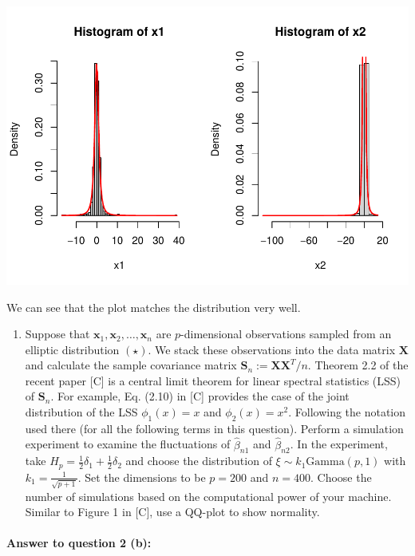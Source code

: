 \documentclass[
]{article}
\providecommand{\tightlist}{%
  \setlength{\itemsep}{0pt}\setlength{\parskip}{0pt}}
\begin{document}
\includegraphics{A5_files/figure-latex/unnamed-chunk-16-1.pdf}

We can see that the plot matches the distribution very well.

\begin{enumerate}
\def\labelenumi{(\alph{enumi})}
\setcounter{enumi}{1}
\tightlist
\item
  Suppose that \(\mathbf{x}_1, \mathbf{x}_2, \dots, \mathbf{x}_n\) are
  \(p\)-dimensional observations sampled from an elliptic distribution
  \((\star)\). We stack these observations into the data matrix
  \(\mathbf{X}\) and calculate the sample covariance matrix
  \(\mathbf{S}_n := \mathbf{X} \mathbf{X}^T / n\). Theorem 2.2 of the
  recent paper {[}C{]} is a central limit theorem for linear spectral
  statistics (LSS) of \(\mathbf{S}_n\). For example, Eq. (2.10) in
  {[}C{]} provides the case of the joint distribution of the LSS
  \(\phi_1(x) = x\) and \(\phi_2(x) = x^2\). Following the notation used
  there (for all the following terms in this question). Perform a
  simulation experiment to examine the fluctuations of
  \(\hat{\beta}_{n1}\) and \(\hat{\beta}_{n2}\). In the experiment, take
  \(H_p = \frac{1}{2} \delta_1 + \frac{1}{2} \delta_2\) and choose the
  distribution of \(\xi \sim k_1 \text{Gamma}(p, 1)\) with
  \(k_1 = \frac{1}{\sqrt{p + 1}}\). Set the dimensions to be \(p = 200\)
  and \(n = 400\). Choose the number of simulations based on the
  computational power of your machine. Similar to Figure 1 in {[}C{]},
  use a QQ-plot to show normality.
\end{enumerate}

\paragraph{\texorpdfstring{\textbf{Answer to question 2
(b)}:}{Answer to question 2 (b):}}\label{answer-to-question-2-b}
\end{document}
